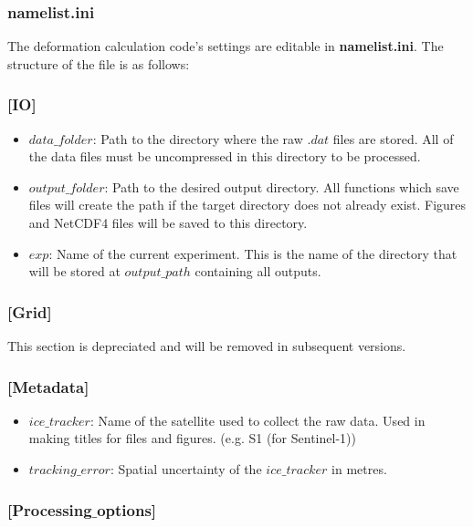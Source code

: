 \documentclass[12pt]{article}
\begin{document}
\subsubsection*{\textbf{namelist.ini}}

The deformation calculation code's settings are editable in \textbf{namelist.ini}. The structure of the file is as follows:

\subsubsection*{[IO]}

\begin{itemize}
    \item $data\_folder$: Path to the directory where the raw $.dat$ files are stored. All of the data files must be uncompressed in this directory to be processed.
    \item $output\_folder$: Path to the desired output directory. All functions which save files will create the path if the target directory does not already exist. Figures and NetCDF4 files will be saved to this directory.
    \item $exp$: Name of the current experiment. This is the name of the directory that will be stored at $output\_path$ containing all outputs.
\end{itemize}

\subsubsection*{[Grid]}

This section is depreciated and will be removed in subsequent versions.

\subsubsection*{[Metadata]}

\begin{itemize}
    \item $ice\_tracker$: Name of the satellite used to collect the raw data. Used in making titles for files and figures. (e.g. S1 (for Sentinel-1))
    \item $tracking\_error$: Spatial uncertainty of the $ice\_tracker$ in metres.
\end{itemize}

\subsubsection*{[Processing$\_$options]}
\end{document}
